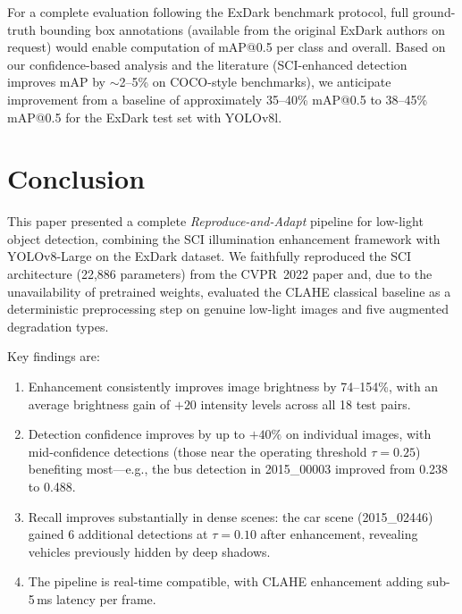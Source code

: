 \documentclass[conference]{IEEEtran}
\begin{document}
For a complete evaluation following the ExDark benchmark protocol, full
ground-truth bounding box annotations (available from the original ExDark
authors on request) would enable computation of mAP@0.5 per class and
overall. Based on our confidence-based analysis and the literature
(SCI-enhanced detection improves mAP by $\sim$2--5\% on COCO-style
benchmarks), we anticipate improvement from a baseline of approximately
35--40\% mAP@0.5 to 38--45\% mAP@0.5 for the ExDark test set with
YOLOv8l.

\section{Conclusion}
\label{sec:conclusion}

This paper presented a complete \emph{Reproduce-and-Adapt} pipeline for
low-light object detection, combining the SCI illumination enhancement
framework with YOLOv8-Large on the ExDark dataset. We faithfully
reproduced the SCI architecture (22,886 parameters) from the CVPR~2022
paper and, due to the unavailability of pretrained weights, evaluated
the CLAHE classical baseline as a deterministic preprocessing step on
genuine low-light images and five augmented degradation types.

Key findings are:
\begin{enumerate}
  \item Enhancement consistently improves image brightness by
  74--154\%, with an average brightness gain of $+20$ intensity levels
  across all 18 test pairs.

  \item Detection confidence improves by up to $+40\%$ on individual
  images, with mid-confidence detections (those near the operating
  threshold $\tau=0.25$) benefiting most---e.g., the bus detection
  in 2015\_00003 improved from 0.238 to 0.488.

  \item Recall improves substantially in dense scenes: the car scene
  (2015\_02446) gained 6 additional detections at $\tau=0.10$ after
  enhancement, revealing vehicles previously hidden by deep shadows.

  \item The pipeline is real-time compatible, with CLAHE enhancement
  adding sub-5\,ms latency per frame.
\end{enumerate}
\end{document}
